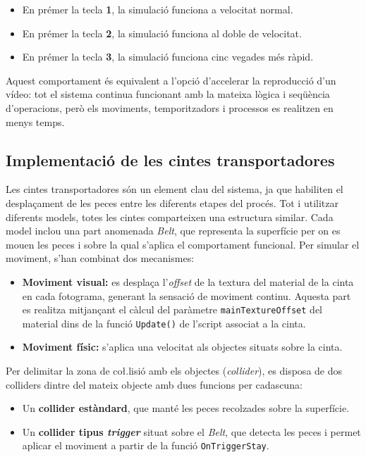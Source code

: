 \documentclass[a4paper,11pt,DIV=13,headings=normal,abstract=true,twoside=semi]{article}
\begin{document}
\begin{itemize}
\item En prémer la tecla \textbf{1}, la simulació funciona a velocitat normal.
\item En prémer la tecla \textbf{2}, la simulació funciona al doble de velocitat.
\item En prémer la tecla \textbf{3}, la simulació funciona cinc vegades més ràpid.
\end{itemize}

Aquest comportament és equivalent a l'opció d'accelerar la reproducció d'un vídeo: tot el sistema continua funcionant amb la mateixa lògica i seqüència d'operacions, però els moviments, temporitzadors i processos es realitzen en menys temps.

\subsection{Implementació de les cintes transportadores}

Les cintes transportadores són un element clau del sistema, ja que habiliten el desplaçament de les peces entre les diferents etapes del procés. Tot i utilitzar diferents models, totes les cintes comparteixen una estructura similar. Cada model inclou una part anomenada \emph{Belt}, que representa la superfície per on es mouen les peces i sobre la qual s'aplica el comportament funcional.  Per simular el moviment, s'han combinat dos mecanismes:

\begin{itemize}
\item \textbf{Moviment visual:} es desplaça l'\emph{offset} de la textura del material de la cinta en cada fotograma, generant la sensació de moviment continu. Aquesta part es realitza mitjançant el càlcul del paràmetre \texttt{mainTextureOffset} del material dins de la funció \texttt{Update()} \cite{UnityUpdate} de l'script associat a la cinta.
\item \textbf{Moviment físic:} s'aplica una velocitat als objectes situats sobre la cinta.
\end{itemize}

Per delimitar la zona de co\l.lisió amb els objectes (\emph{collider}), es disposa de dos colliders dintre del mateix objecte amb dues funcions per cadascuna: 

\begin{itemize}
\item Un \textbf{collider estàndard}, que manté les peces recolzades sobre la superfície.
\item Un \textbf{collider tipus \emph{trigger}} situat sobre el \emph{Belt}, que detecta les peces i permet aplicar el moviment a partir de la funció \texttt{OnTriggerStay}.
\end{itemize}
\end{document}
